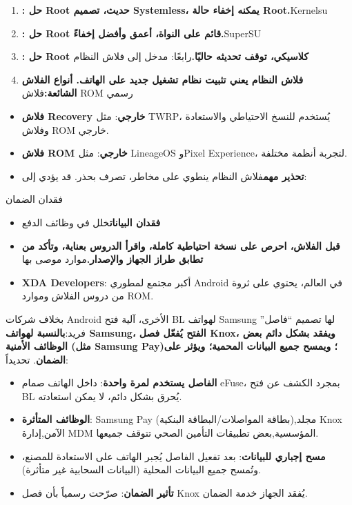\begin{enumerate}
  \item \textbf{: حل Root حديث، تصميم Systemless، يمكنه إخفاء حالة Root.}Kernelsu
  \item \textbf{: حل Root قائم على النواة، أعمق وأفضل إخفاءً.}SuperSU
  \item \textbf{: حل Root كلاسيكي، توقف تحديثه حاليًا.}رابعًا: مدخل إلى فلاش النظام
  \item \textbf{فلاش النظام يعني تثبيت نظام تشغيل جديد على الهاتف. أنواع الفلاش الشائعة:}فلاش ROM رسمي
\end{enumerate}


\begin{itemize}
  \item \textbf{فلاش Recovery خارجي}: مثل TWRP، يُستخدم للنسخ الاحتياطي والاستعادة وفلاش ROM خارجي.
  \item \textbf{فلاش ROM خارجي}: مثل LineageOS وPixel Experience، لتجربة أنظمة مختلفة.
  \item \textbf{تحذير مهم}فلاش النظام ينطوي على مخاطر، تصرف بحذر. قد يؤدي إلى:
\end{itemize}


فقدان الضمان

\begin{itemize}
  \item \textbf{فقدان البيانات}خلل في وظائف الدفع
  \item \textbf{قبل الفلاش، احرص على نسخة احتياطية كاملة، واقرأ الدروس بعناية، وتأكد من تطابق طراز الجهاز والإصدار.}موارد موصى بها
  \item \textbf{XDA Developers}: أكبر مجتمع لمطوري Android في العالم، يحتوي على ثروة من دروس الفلاش وموارد ROM.
\end{itemize}


بخلاف شركات Android الأخرى، آلية فتح BL لهواتف Samsung لها تصميم “فاصل” فريد:\textbf{بالنسبة لهواتف Samsung، الفتح يُفعّل فصل Knox، ويفقد بشكل دائم بعض الوظائف الأمنية (مثل Samsung Pay)؛ ويمسح جميع البيانات المحمية؛ ويؤثر على الضمان}. تحديداً:

\begin{itemize}
  \item \textbf{الفاصل يستخدم لمرة واحدة}: داخل الهاتف صمام eFuse، بمجرد الكشف عن فتح BL يُحرق بشكل دائم، لا يمكن استعادته.
  \item \textbf{الوظائف المتأثرة}: Samsung Pay (بطاقة المواصلات/البطاقة البنكية),مجلد Knox الآمن,إدارة MDM المؤسسية,بعض تطبيقات التأمين الصحي تتوقف جميعها.
  \item \textbf{مسح إجباري للبيانات}: بعد تفعيل الفاصل يُجبر الهاتف على الاستعادة للمصنع، وتُمسح جميع البيانات المحلية (البيانات السحابية غير متأثرة).
  \item \textbf{تأثير الضمان}: صرّحت رسمياً بأن فصل Knox يُفقد الجهاز خدمة الضمان.
\end{itemize}

